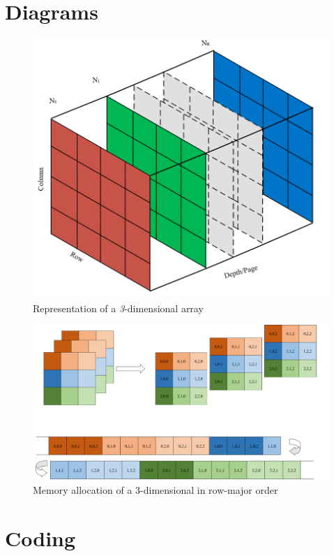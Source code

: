 \documentclass[10pt, conference]{IEEEtran}
\begin{document}
\onecolumn
\center
\begin{appendices}
\section{Diagrams}
\label{Diagrams}

\begin{figure}[h!]
\renewcommand{\thefigure}{\arabic{figure}}
\centering
\includegraphics[scale=0.4]{DimensionalArray.png}
\caption{Representation of a \emph{3}-dimensional array}
\label{DimArray}
\end{figure}

\begin{figure}[h!]
\renewcommand{\thefigure}{\arabic{figure}}
\centering
\includegraphics[scale=0.5]{MemoryAlloc.png}
\caption{Memory allocation of a 3-dimensional in row-major order~\cite{Eli}}
\label{3DArray}
\end{figure}

\onecolumn
\section{Coding}
\label{Coding}

\end{appendices}




\end{document}
